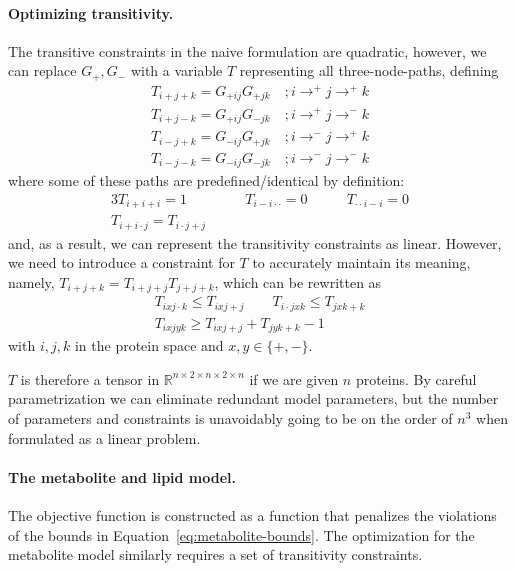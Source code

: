 \documentclass{article}
\begin{document}
\paragraph{Optimizing transitivity.}
The transitive constraints in the na\:ive formulation are quadratic, however, we can replace $G_+, G_-$ with a variable $T$ representing all three-node-paths, defining
\begin{align}
 T_{i+j+k} = G_{+ij} G_{+jk} \quad; i \rightarrow^+ j \rightarrow^+ k \\
 T_{i+j-k} = G_{+ij} G_{-jk} \quad; i \rightarrow^+ j \rightarrow^- k \\
 T_{i-j+k} = G_{-ij} G_{+jk} \quad; i \rightarrow^- j \rightarrow^+ k \\
 T_{i-j-k} = G_{-ij} G_{-jk} \quad; i \rightarrow^- j \rightarrow^- k
\end{align}
where some of these paths are predefined/identical by definition:
\begin{alignat}{3}
 T_{i+i+i} = 1 \qquad & T_{i-i \cdot \cdot} = 0 \qquad & T_{ \cdot \cdot i - i } = 0 \\
 T_{i+i \cdot j} = T_{i \cdot j+j} \qquad &
\end{alignat}
and, as a result, we can represent the transitivity constraints as linear.
However, we need to introduce a constraint for $T$ to accurately maintain its meaning, namely, $T_{i+j+k} = T_{i+j+j} T_{j+j+k}$, which can be rewritten as
\begin{gather}
  T_{i x j \cdot k} \leq T_{i x j+j} \qquad T_{i \cdot j x k} \leq T_{j x k + k} \\
  T_{i x j y k} \geq T_{i x j + j} + T_{j y k + k} - 1
\end{gather}
with $i,j,k$ in the protein space and $x,y \in \{+,-\}$.

$T$ is therefore a tensor in $\mathbb R^{n \times 2 \times n \times 2 \times n}$ if we are given $n$ proteins.
By careful parametrization we can eliminate redundant model parameters, but the number of parameters and constraints is unavoidably going to be on the order of $n^3$ when formulated as a linear problem.

\paragraph{The metabolite and lipid model.}
The objective function is constructed as a function that penalizes the violations of the bounds in Equation~\eqref{eq:metabolite-bounds}.
The optimization for the metabolite model similarly requires a set of transitivity constraints.
\end{document}
